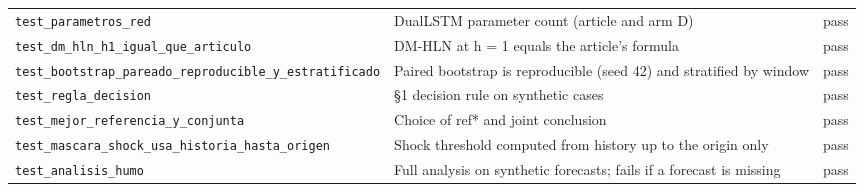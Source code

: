 \begin{tabular}{p{5.2cm}p{8cm}l}
\texttt{test\_parametros\_red} & DualLSTM parameter count (article and arm D) & pass \\
\texttt{test\_dm\_hln\_h1\_igual\_que\_articulo} & DM-HLN at h = 1 equals the article's formula & pass \\
\texttt{test\_bootstrap\_pareado\_reproducible\_y\_estratificado} & Paired bootstrap is reproducible (seed 42) and stratified by window & pass \\
\texttt{test\_regla\_decision} & §1 decision rule on synthetic cases & pass \\
\texttt{test\_mejor\_referencia\_y\_conjunta} & Choice of ref* and joint conclusion & pass \\
\texttt{test\_mascara\_shock\_usa\_historia\_hasta\_origen} & Shock threshold computed from history up to the origin only & pass \\
\texttt{test\_analisis\_humo} & Full analysis on synthetic forecasts; fails if a forecast is missing & pass \\
\bottomrule
\end{tabular}
